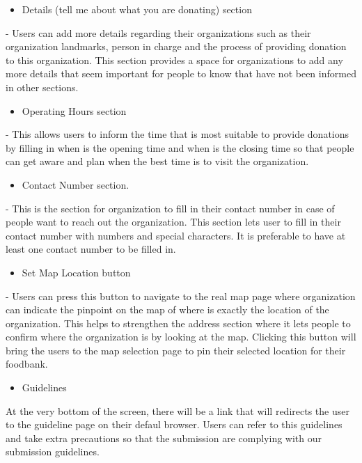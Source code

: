 \documentclass[conference]{IEEEtran}
\begin{document}
\begin{itemize}
\item Details (tell me about what you are donating) section
\end{itemize}
- Users can add more details regarding their organizations such as their organization landmarks, person in charge and the process of providing donation to this organization. This section provides a space for organizations to add any more details that seem important for people to know that have not been informed in other sections. \\

\begin{itemize}
\item Operating Hours section
\end{itemize}
- This allows users to inform the time that is most suitable to provide donations by filling in when is the opening time and when is the closing time so that people can get aware and plan when the best time is to visit the organization.\\

\begin{itemize}
\item Contact Number section.
\end{itemize}
- This is the section for organization to fill in their contact number in case of people want to reach out the organization. This section lets user to fill in their contact number with numbers and special characters. It is preferable to have at least one contact number to be filled in.\\

\begin{itemize}
\item Set Map Location button 
\end{itemize}
- Users can press this button to navigate to the real map page where organization can indicate the pinpoint on the map of where is exactly the location of the organization. This helps to strengthen the address section where it lets people to confirm where the organization is by looking at the map. Clicking this button will bring the users to the map selection page to pin their selected location for their foodbank. \\

\begin{itemize}
\item Guidelines
\end{itemize}
At the very bottom of the screen, there will be a link that will redirects the user to the guideline page on their defaul browser. Users can refer to this guidelines and take extra precautions so that the submission are complying with our submission guidelines.
\end{document}
